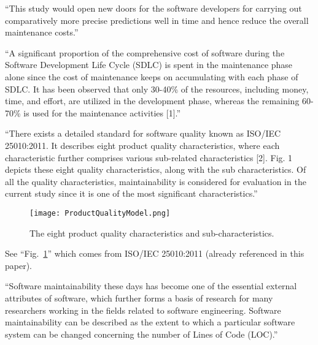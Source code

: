 \documentclass[12pt,letterpaper]{report}
\begin{document}
``This study would open new doors for the software developers for carrying out comparatively more precise predictions well in time and hence reduce the overall maintenance costs.'' \cite{gupta:2021}

``A significant proportion of the comprehensive cost of software during the Software Development Life Cycle (SDLC) is spent in the maintenance phase alone since the cost of maintenance keeps on accumulating with each phase of SDLC. It has been observed that only 30-40\% of the resources, including money, time, and effort, are utilized in the development phase, whereas the remaining 60-70\% is used for the maintenance activities [1].'' \cite{gupta:2021}


``There exists a detailed standard for software quality known as ISO/IEC 25010:2011. It describes eight product quality characteristics, where each characteristic further comprises various sub-related characteristics [2]. Fig. 1 depicts these eight quality characteristics, along with the sub characteristics. Of all the quality characteristics, maintainability is considered for evaluation in the current study since it is one of the most significant characteristics.''


\begin{figure}[ht]
  \centerline{
      \texttt{[image: ProductQualityModel.png]}
  }
  \caption{The eight product quality characteristics and sub-characteristics.}
  \label{figProductQualityModel}
\end{figure}

See ``Fig.~\ref{figProductQualityModel}'' which comes from ISO/IEC 25010:2011 \cite{iso/iec:25010:2011} (already referenced in this paper).

``Software maintainability these days has become one of the essential external attributes of software, which further forms a basis of research for many researchers working in the fields related to software engineering. Software maintainability can be described as the extent to which a particular software system can be changed concerning the number of Lines of Code (LOC).'' \cite{gupta:2021}
\end{document}
